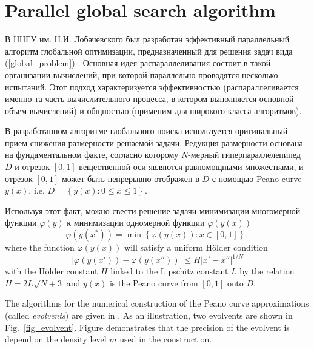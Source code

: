 \documentclass{svproc}
\begin{document}
\section{Parallel global search algorithm}

В ННГУ им. Н.И. Лобачевского был разработан \cite{Barkalov2018,Strongin2018,globalizerSystem} эффективный параллельный алгоритм глобальной оптимизации, предназначенный для решения задач вида (\ref{global_problem}) . 
Основная идея распараллеливания состоит в такой организации вычислений, при которой параллельно проводятся несколько испытаний. Этот подход характеризуется эффективностью (распараллеливается именно та часть вычислительного процесса, в котором выполняется основной объем вычислений) и общностью (применим для широкого класса алгоритмов).

В разработанном алгоритме глобального поиска используется оригинальный прием снижения размерности решаемой задачи. 
Редукция размерности основана на фундаментальном факте, согласно которому $N$-мерный гиперпараллелепипед $D$ и отрезок $[0,1]$ вещественной оси являются равномощными множествами, и отрезок $[0,1]$ может быть непрерывно отображен в $D$ с помощью Peano curve $y(x)$, i.e. $D = \left\{y(x):0\leq x\leq 1\right\}$.

Используя этот факт, можно свести решение задачи минимизации многомерной функции $\varphi(y)$ к минимизации одномерной функции $\varphi(y(x))$
\begin{equation}\label{1d_problem}
\varphi(y (x^*)) = \min \left\{ \varphi (y(x)) : x\in [0,1] \right\},
\end{equation}
where the function $\varphi(y(x))$ will satisfy a uniform H{\"o}lder condition
\[
\left|\varphi(y(x'))-\varphi(y(x''))\right|\leq H\left|x'-x''\right|^{1/N}
\]
with the H{\"o}lder constant $H$ linked to the Lipschitz constant $L$ by the relation
$ H=2 L \sqrt{N+3}$ and $y(x)$ is the Peano curve from $[0,1]$ onto $D$.

The algorithms for the numerical construction of the Peano curve approximations (called \textit{evolvents})
are given in \cite{Strongin2000,Sergeyev2013}. As an illustration, two evolvents are shown in Fig.~\ref{fig_evolvent}. Figure demonstrates that the precision of the evolvent is depend on the density level $m$ used in the construction.
\end{document}

